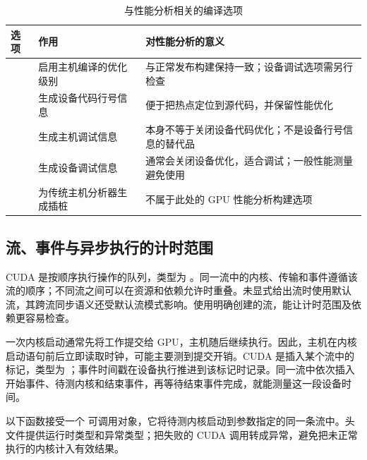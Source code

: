\begin{table}[htbp]
\centering\small
\caption{与性能分析相关的编译选项}
\label{l14:tab:compile}
\begin{tabularx}{\textwidth}{@{}p{28mm}YY@{}}
\toprule
选项 & 作用 & 对性能分析的意义\\
\midrule
{} & 启用主机编译的优化级别 & 与正常发布构建保持一致；设备调试选项需另行检查\\
 & 生成设备代码行号信息 & 便于把热点定位到源代码，并保留性能优化\\
 & 生成主机调试信息 & 本身不等于关闭设备代码优化；不是设备行号信息的替代品\\
 & 生成设备调试信息 & 通常会关闭设备优化，适合调试；一般性能测量避免使用\\
 & 为传统主机分析器生成插桩 & 不属于此处的 GPU 性能分析构建选项\\
\bottomrule
\end{tabularx}
\end{table}

\subsection{流、事件与异步执行的计时范围}

CUDA 是按顺序执行操作的队列，类型为 。同一流中的内核、传输和事件遵循该流的顺序；不同流之间可以在资源和依赖允许时重叠。未显式给出流时使用默认流，其跨流同步语义还受默认流模式影响。使用明确创建的流，能让计时范围及依赖更容易检查。

一次内核启动通常先将工作提交给 GPU，主机随后继续执行。因此，主机在内核启动语句前后立即读取时钟，可能主要测到提交开销。CUDA 是插入某个流中的标记，类型为 ；事件时间戳在设备执行推进到该标记时记录。同一流中依次插入开始事件、待测内核和结束事件，再等待结束事件完成，就能测量这一段设备时间。

以下函数接受一个  可调用对象，它将待测内核启动到参数指定的同一条流中。头文件提供运行时类型和异常类型；把失败的 CUDA 调用转成异常，避免把未正常执行的内核计入有效结果。

